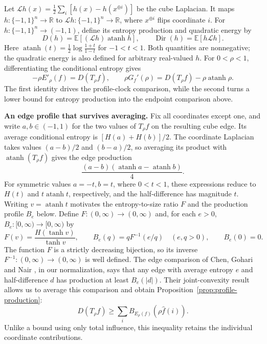 \documentclass[11pt,letterpaper]{amsart}
\newcommand{\E}{\mathbb E}
\newcommand{\R}{\mathbb R}
\newcommand{\1}{\mathbf 1}
\DeclareMathOperator{\atanh}{atanh}
\numberwithin{equation}{section}
\begin{document}
Let $\mathcal Lh(x)=\frac12\sum_i[h(x)-h(x^{\oplus i})]$ be the cube
Laplacian. It maps $h:\{-1,1\}^n\to\R$ to
$\mathcal Lh:\{-1,1\}^n\to\R$, where $x^{\oplus i}$ flips coordinate $i$.
For $h:\{-1,1\}^n\to(-1,1)$, define its entropy production and
quadratic energy by
\[
 D(h)=\E[(\mathcal Lh)\atanh h],\qquad
 \operatorname{Dir}(h)=\E[h\mathcal Lh].
\]
Here $\atanh(t)=\frac{1}{2}\log \frac{1+t}{1-t}$ for $-1<t<1$.
Both quantities are nonnegative; the quadratic energy is also defined
for arbitrary real-valued $h$. For $0<\rho<1$, differentiating the
conditional entropy gives
\begin{equation}\label{intro:gap-slope}
 -\rho E'_\rho(f)=D(T_\rho f),\qquad
 \rho G_f'(\rho)=D(T_\rho f)-\rho\atanh\rho.
\end{equation}
The first identity drives the profile-clock comparison, while the
second turns a lower bound for entropy production into the endpoint
comparison above.

\medskip
\noindent\textbf{An edge profile that survives averaging.}
Fix all coordinates except one, and write $a,b\in(-1,1)$ for
the two values of $T_\rho f$ on the resulting cube edge. Its average
conditional entropy is $[H(a)+H(b)]/2$. The coordinate Laplacian
takes values $(a-b)/2$ and $(b-a)/2$, so averaging its product with
$\atanh(T_\rho f)$ gives the edge production
\[
 \frac{(a-b)(\atanh a-\atanh b)}4.
\]
For symmetric values $a=-t,b=t$, where $0<t<1$, these expressions
reduce to $H(t)$ and $t\atanh t$, respectively, and the half-difference
has magnitude $t$. Writing $v=\atanh t$ motivates the entropy-to-size
ratio $F$ and the production profile $B_e$ below.
Define $F:(0,\infty)\to(0,\infty)$ and, for each $e>0$,
$B_e:[0,\infty)\to[0,\infty)$ by
\[
 F(v)=\frac{H(\tanh v)}{\tanh v},\qquad
 B_e(q)=qF^{-1}(e/q)\quad(e,q>0),\qquad B_e(0)=0.
\]
The function $F$ is a strictly decreasing bijection, so its inverse
$F^{-1}:(0,\infty)\to(0,\infty)$ is well defined.
The edge comparison of Chen, Gohari and Nair
\cite[Lemma~10]{ChenGohariNair2025}, in our normalization, says that
any edge with average entropy $e$ and half-difference $d$ has production
at least $B_e(|d|)$. Their joint-convexity result
\cite[Lemma~13]{ChenGohariNair2025} allows us to average this comparison and
obtain Proposition~\ref{prop:profile-production}:
\begin{equation}\label{intro:production}
 D(T_\rho f)\ge\sum_i B_{E_\rho(f)}(\rho \widehat f(i)).
\end{equation}
Unlike a bound using only total influence, this inequality retains
the individual coordinate contributions.
\end{document}
